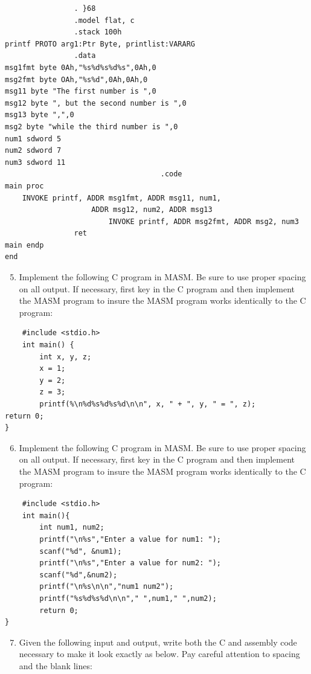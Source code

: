 \documentclass[10pt]{book}
\begin{document}
\begin{verbatim}
                . }68
                .model flat, c
                .stack 100h
printf PROTO arg1:Ptr Byte, printlist:VARARG
                .data
msg1fmt byte 0Ah,"%s%d%s%d%s",0Ah,0
msg2fmt byte OAh,"%s%d",0Ah,0Ah,0
msg11 byte "The first number is ",0
msg12 byte ", but the second number is ",0
msg13 byte ",",0
msg2 byte "while the third number is ",0
num1 sdword 5
num2 sdword 7
num3 sdword 11
                                    .code
main proc
    INVOKE printf, ADDR msg1fmt, ADDR msg11, num1,
                    ADDR msg12, num2, ADDR msg13
                        INVOKE printf, ADDR msg2fmt, ADDR msg2, num3
                ret
main endp
end
\end{verbatim}

\begin{enumerate}
  \setcounter{enumi}{4}
  \item Implement the following C program in MASM. Be sure to use proper spacing on all output. If necessary, first key in the C program and then implement the MASM program to insure the MASM program works identically to the C program:
\end{enumerate}

\begin{verbatim}
    #include <stdio.h>
    int main() {
        int x, y, z;
        x = 1;
        y = 2;
        z = 3;
        printf(%\n%d%s%d%s%d\n\n", x, " + ", y, " = ", z);
return 0;
}
\end{verbatim}

\begin{enumerate}
  \setcounter{enumi}{5}
  \item Implement the following C program in MASM. Be sure to use proper spacing on all output. If necessary, first key in the C program and then implement the MASM program to insure the MASM program works identically to the C program:
\end{enumerate}

\begin{verbatim}
    #include <stdio.h>
    int main(){
        int num1, num2;
        printf("\n%s","Enter a value for num1: ");
        scanf("%d", &num1);
        printf("\n%s","Enter a value for num2: ");
        scanf("%d",&num2);
        printf("\n%s\n\n","num1 num2");
        printf("%s%d%s%d\n\n"," ",num1," ",num2);
        return 0;
}
\end{verbatim}

\begin{enumerate}
  \setcounter{enumi}{6}
  \item Given the following input and output, write both the C and assembly code necessary to make it look exactly as below. Pay careful attention to spacing and the blank lines:
\end{enumerate}
\end{document}
